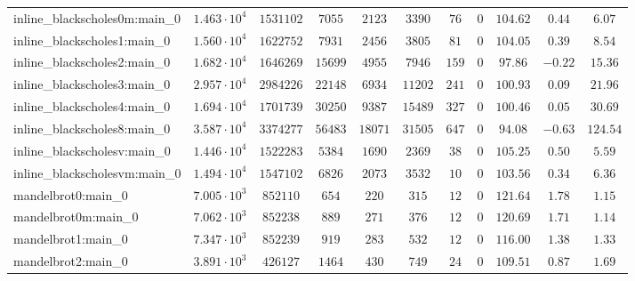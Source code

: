 \begin{tabular}{|l|c|c|c|c|c|c|c|c|c|c|}
inline\_blackscholes0m:main\_0 & $ 1.463 \cdot 10^{4} $ & $ 1531102  $ & $ 7055   $ & $ 2123   $ & $ 3390   $ & $ 76   $ & $ 0    $ & $ 104.62      $ & $ 0.44    $ & $ 6.07    $ \\
inline\_blackscholes1:main\_0  & $ 1.560 \cdot 10^{4} $ & $ 1622752  $ & $ 7931   $ & $ 2456   $ & $ 3805   $ & $ 81   $ & $ 0    $ & $ 104.05      $ & $ 0.39    $ & $ 8.54    $ \\
inline\_blackscholes2:main\_0  & $ 1.682 \cdot 10^{4} $ & $ 1646269  $ & $ 15699  $ & $ 4955   $ & $ 7946   $ & $ 159  $ & $ 0    $ & $ 97.86       $ & $ -0.22   $ & $ 15.36   $ \\
inline\_blackscholes3:main\_0  & $ 2.957 \cdot 10^{4} $ & $ 2984226  $ & $ 22148  $ & $ 6934   $ & $ 11202  $ & $ 241  $ & $ 0    $ & $ 100.93      $ & $ 0.09    $ & $ 21.96   $ \\
inline\_blackscholes4:main\_0  & $ 1.694 \cdot 10^{4} $ & $ 1701739  $ & $ 30250  $ & $ 9387   $ & $ 15489  $ & $ 327  $ & $ 0    $ & $ 100.46      $ & $ 0.05    $ & $ 30.69   $ \\
inline\_blackscholes8:main\_0  & $ 3.587 \cdot 10^{4} $ & $ 3374277  $ & $ 56483  $ & $ 18071  $ & $ 31505  $ & $ 647  $ & $ 0    $ & $ 94.08       $ & $ -0.63   $ & $ 124.54  $ \\
inline\_blackscholesv:main\_0  & $ 1.446 \cdot 10^{4} $ & $ 1522283  $ & $ 5384   $ & $ 1690   $ & $ 2369   $ & $ 38   $ & $ 0    $ & $ 105.25      $ & $ 0.50    $ & $ 5.59    $ \\
inline\_blackscholesvm:main\_0 & $ 1.494 \cdot 10^{4} $ & $ 1547102  $ & $ 6826   $ & $ 2073   $ & $ 3532   $ & $ 10   $ & $ 0    $ & $ 103.56      $ & $ 0.34    $ & $ 6.36    $ \\
mandelbrot0:main\_0            & $ 7.005 \cdot 10^{3} $ & $ 852110   $ & $ 654    $ & $ 220    $ & $ 315    $ & $ 12   $ & $ 0    $ & $ 121.64      $ & $ 1.78    $ & $ 1.15    $ \\
mandelbrot0m:main\_0           & $ 7.062 \cdot 10^{3} $ & $ 852238   $ & $ 889    $ & $ 271    $ & $ 376    $ & $ 12   $ & $ 0    $ & $ 120.69      $ & $ 1.71    $ & $ 1.14    $ \\
mandelbrot1:main\_0            & $ 7.347 \cdot 10^{3} $ & $ 852239   $ & $ 919    $ & $ 283    $ & $ 532    $ & $ 12   $ & $ 0    $ & $ 116.00      $ & $ 1.38    $ & $ 1.33    $ \\
mandelbrot2:main\_0            & $ 3.891 \cdot 10^{3} $ & $ 426127   $ & $ 1464   $ & $ 430    $ & $ 749    $ & $ 24   $ & $ 0    $ & $ 109.51      $ & $ 0.87    $ & $ 1.69    $ \\

\end{tabular}
